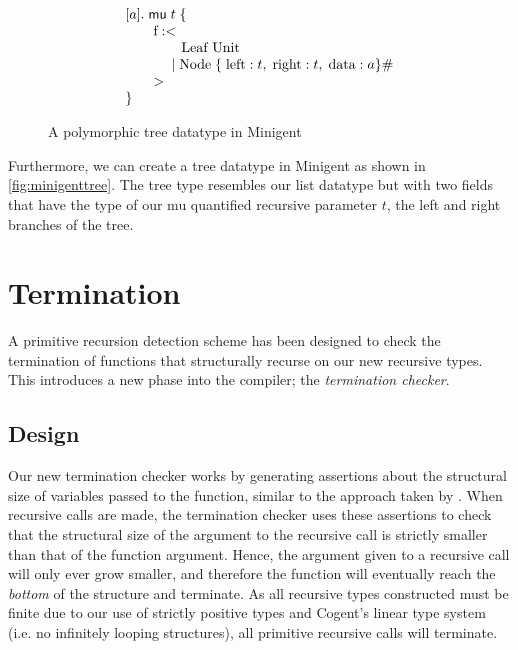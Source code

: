 \begin{figure}
    \centering

    \[
        \begin{array}{l}
            [a].\; \textsf{mu}\; t\; \{\; \\
            \hspace{2em} \text{f}: < \\
            \hspace{4em} \text{Leaf Unit}\; \\
            \hspace{3.3em} |\; \text{Node}\; \{\; \text{left}: t,\; \text{right}: t,\; \text{data}: a \}\# \\
            \hspace{2em} >  \\
            \}
        \end{array}
    \]
    
    \caption{A polymorphic tree datatype in Minigent}
    \label{fig:minigenttree}
\end{figure}

Furthermore, we can create a tree datatype in Minigent as shown in \autoref{fig:minigenttree}.
The tree type resembles our list datatype but with two fields that have the type of our
\textsf{mu} quantified recursive parameter $t$, the left and right branches of the tree.

\section{Termination}

A primitive recursion detection scheme has been designed to check the termination
of functions that structurally recurse on our new recursive types. This introduces
a new phase into the compiler; the \textit{termination checker}.

\subsection{Design}

Our new termination checker works by generating assertions about the structural
size of variables passed to the function, similar to the approach
taken by \citet{Foetus}. When recursive calls are made, the termination checker
uses these assertions to check that the structural size of the argument to the
recursive call is strictly smaller than that of the function argument. Hence, the argument
given to a recursive call will only ever grow smaller, and therefore the function will
eventually reach the \emph{bottom} of the structure and terminate.
As all recursive types constructed must be finite due to our use of strictly positive
types and Cogent's linear type system (i.e. no infinitely looping structures),
all primitive recursive calls will terminate.

